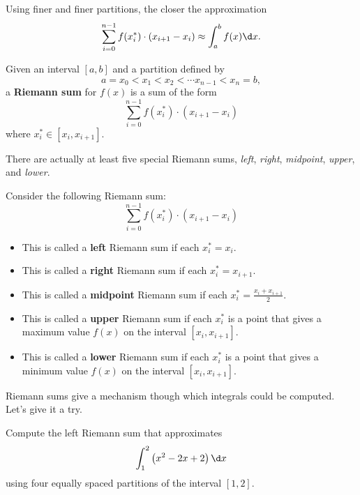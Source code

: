\begin{marginfigure}
\caption{Using finer and finer partitions, the closer the approximation
\[
\sum_{i=0}^{n-1} f(x_i^*) \cdot (x_{i+1}-x_i) \approx \int_a^b f(x) \d x.
\]}
\label{figure:partitionsfiner}
\end{marginfigure}


\begin{definition}
Given an interval $[a,b]$ and a partition defined by
\[
a = x_0 < x_1 <x_2 < \cdots x_{n-1}< x_n = b,
\]
a \textbf{Riemann sum} for $f(x)$ is a sum of the form
\[
\sum_{i=0}^{n-1} f(x_i^*) \cdot (x_{i+1}-x_i)
\]
where $x_i^*\in [x_i,x_{i+1}]$.
\end{definition}

There are actually at least five special Riemann sums, \textit{left},
\textit{right}, \textit{midpoint}, \textit{upper}, and \textit{lower}.

\begin{definition}
Consider the following Riemann sum:
\[
\sum_{i=0}^{n-1} f(x_i^*) \cdot (x_{i+1}-x_i)
\]
\begin{itemize}
\item This is called a \textbf{left} Riemann sum if each $x_i^* =
  x_i$.
\item This is called a \textbf{right} Riemann sum if each $x_i^* =
  x_{i+1}$.
\item This is called a \textbf{midpoint} Riemann sum if each $x_i^*
  = \frac{x_i+x_{i+1}}{2}$.
\item This is called a \textbf{upper} Riemann sum if each $x_i^*$ is
  a point that gives a maximum value $f(x)$ on the interval
  $[x_i,x_{i+1}]$.
\item This is called a \textbf{lower} Riemann sum if each $x_i^*$ is a
  point that gives a minimum value $f(x)$ on the interval
  $[x_i,x_{i+1}]$.
\end{itemize}
\end{definition}
Riemann sums give a mechanism though which integrals could be
computed. Let's give it a try.

\begin{example}
Compute the left Riemann sum that approximates
\[
\int_1^2 \left(x^2-2x+2\right)\d x
\]
using four equally spaced partitions of the interval $[1,2]$.
\end{example}

